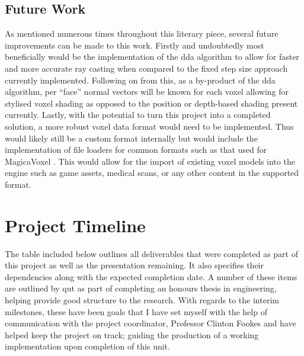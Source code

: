 \documentclass[titlepage]{article}
\begin{document}
\subsection{Future Work}

As mentioned numerous times throughout this literary piece, several future improvements can be made to this work. Firstly and undoubtedly most beneficially would be the implementation of the \gls{dda} algorithm to allow for faster and more accurate ray casting when compared to the fixed step size approach currently implemented. Following on from this, as a by-product of the \gls{dda} algorithm, per ``face'' normal vectors will be known for each voxel allowing for stylised voxel shading as opposed to the position or depth-based shading present currently. Lastly, with the potential to turn this project into a completed solution, a more robust voxel data format would need to be implemented. Thus would likely still be a custom format internally but would include the implementation of file loaders for common formats such as that used for MagicaVoxel \cite{magicavoxel}. This would allow for the import of existing voxel models into the engine such as game assets, medical scans, or any other content in the supported format.

\appendix

\section{Project Timeline}

The table included below outlines all deliverables that were completed as part of this project as well as the presentation remaining. It also specifies their dependencies along with the expected completion date. A number of these items are outlined by \gls{qut} as part of completing an honours thesis in engineering, helping provide good structure to the research. With regards to the interim milestones, these have been goals that I have set myself with the help of communication with the project coordinator, Professor Clinton Fookes and have helped keep the project on track; guiding the production of a working implementation upon completion of this unit.
\end{document}
